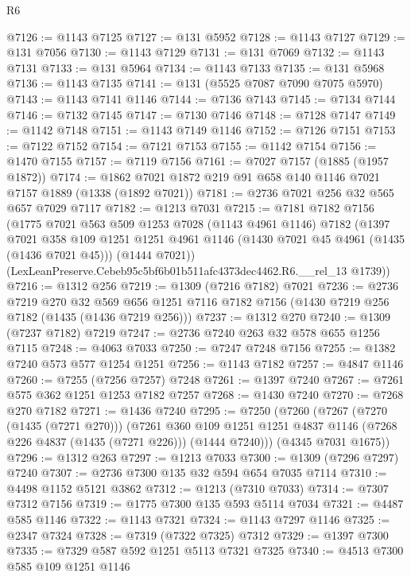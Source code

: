 \begin{lexlean}{R6}
\begin{coremodule}
@7126 := @1143 @7125
@7127 := @131 @5952
@7128 := @1143 @7127
@7129 := @131 @7056
@7130 := @1143 @7129
@7131 := @131 @7069
@7132 := @1143 @7131
@7133 := @131 @5964
@7134 := @1143 @7133
@7135 := @131 @5968
@7136 := @1143 @7135
@7141 := @131 (@5525 @7087 @7090 @7075 @5970)
@7143 := @1143 @7141 @1146
@7144 := @7136 @7143
@7145 := @7134 @7144
@7146 := @7132 @7145
@7147 := @7130 @7146
@7148 := @7128 @7147
@7149 := @1142 @7148
@7151 := @1143 @7149 @1146
@7152 := @7126 @7151
@7153 := @7122 @7152
@7154 := @7121 @7153
@7155 := @1142 @7154
@7156 := @1470 @7155
@7157 := @7119 @7156
@7161 := @7027 @7157 (@1885 (@1957 @1872))
@7174 := @1862 @7021 @1872 @219 @91 @658 @140 @1146 @7021 @7157 @1889 (@1338 (@1892 @7021))
@7181 := @2736 @7021 @256 @32 @565 @657 @7029 @7117
@7182 := @1213 @7031
@7215 := @7181
    @7182
    @7156
    (@1775
      @7021
      @563
      @509
      @1253
      @7028
      (@1143 @4961 @1146)
      @7182
      (@1397
        @7021
        @358
        @109
        @1251
        @1251
        @4961
        @1146
        (@1430 @7021 @45 @4961 (@1435 (@1436 @7021 @45)))
        (@1444 @7021))
      (LexLeanPreserve.Cebeb95c5bf6b01b511afc4373dec4462.R6.__rel_13 @1739))
@7216 := @1312 @256
@7219 := @1309 (@7216 @7182) @7021
@7236 := @2736
    @7219
    @270
    @32
    @569
    @656
    @1251
    @7116
    @7182
    @7156
    (@1430 @7219 @256 @7182 (@1435 (@1436 @7219 @256)))
@7237 := @1312 @270
@7240 := @1309 (@7237 @7182) @7219
@7247 := @2736 @7240 @263 @32 @578 @655 @1256 @7115
@7248 := @4063 @7033
@7250 := @7247 @7248 @7156
@7255 := @1382 @7240 @573 @577 @1254 @1251
@7256 := @1143 @7182
@7257 := @4847 @1146
@7260 := @7255 (@7256 @7257) @7248
@7261 := @1397 @7240
@7267 := @7261 @575 @362 @1251 @1253 @7182 @7257
@7268 := @1430 @7240
@7270 := @7268 @270 @7182
@7271 := @1436 @7240
@7295 := @7250
    (@7260
      (@7267
        (@7270 (@1435 (@7271 @270)))
        (@7261
          @360
          @109
          @1251
          @1251
          @4837
          @1146
          (@7268 @226 @4837 (@1435 (@7271 @226)))
          (@1444 @7240)))
      (@4345 @7031 @1675))
@7296 := @1312 @263
@7297 := @1213 @7033
@7300 := @1309 (@7296 @7297) @7240
@7307 := @2736 @7300 @135 @32 @594 @654 @7035 @7114
@7310 := @4498 @1152 @5121 @3862
@7312 := @1213 (@7310 @7033)
@7314 := @7307 @7312 @7156
@7319 := @1775 @7300 @135 @593 @5114 @7034
@7321 := @4487 @585 @1146
@7322 := @1143 @7321
@7324 := @1143 @7297 @1146
@7325 := @2347 @7324
@7328 := @7319 (@7322 @7325) @7312
@7329 := @1397 @7300
@7335 := @7329 @587 @592 @1251 @5113 @7321 @7325
@7340 := @4513 @7300 @585 @109 @1251 @1146

\end{coremodule}
\end{lexlean}

